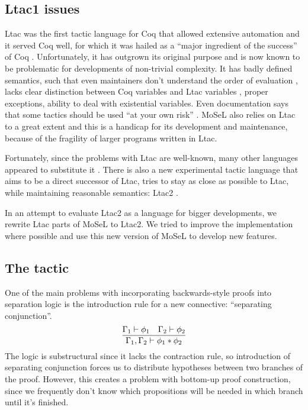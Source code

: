 \subsection{Ltac1 issues}
\label{sec:ltac1-issues}
Ltac was the first tactic language for Coq that allowed extensive automation and it served Coq well, for which it was hailed as a ``major ingredient of the success'' of Coq \cite{pedrotLtac2TacticalWarfare2019}.
Unfortunately, it has outgrown its original purpose and is now known to be problematic for developments of non-trivial complexity.
It has badly defined semantics, such that even maintainers don't understand the order of evaluation \cite{pedrotLtacInternals2016}, lacks clear distinction between Coq variables and Ltac variables \cite{pedrotLtacInternals2016}, proper exceptions, ability to deal with existential variables.
Even documentation says that some tactics should be used ``at your own risk'' \cite[Section~3.3.1]{thecoqdevelopmentteamCoqProofAssistant2020}.
MoSeL also relies on Ltac to a great extent and this is a handicap for its development and maintenance, because of the fragility of larger programs written in Ltac.

Fortunately, since the problems with Ltac are well-known, many other languages appeared to substitute it \cite{malechaExtensibleEfficientAutomation2016, zilianiMtacMonadTyped2013, kaiserMtac2TypedTactics2018a, tassiElpiExtensionLanguage2018}.
There is also a new experimental tactic language that aims to be a direct successor of Ltac, tries to stay as close as possible to Ltac, while maintaining reasonable semantics: Ltac2 \cite{pedrotLtac2TacticalWarfare2019}.

In an attempt to evaluate Ltac2 as a language for bigger developments, we rewrite Ltac parts of MoSeL to Ltac2.
We tried to improve the implementation where possible and use this new version of MoSeL to develop new features.

\subsection{The  tactic}
\label{sec:isplit-tactic}

One of the main problems with incorporating backwards-style proofs into separation logic is the introduction rule for a new connective: ``separating conjunction''.
\[\infer{\Gamma_1, \Gamma_2 \vdash \phi_1 \ast \phi_2}
        {\Gamma_1 \vdash \phi_1 &
         \Gamma_2 \vdash \phi_2} \]
The logic is substructural since it lacks the contraction rule, so introduction of separating conjunction forces us to distribute hypotheses between two branches of the proof.
However, this creates a problem with bottom-up proof construction, since we frequently don't know which propositions will be needed in which branch until it's finished.

